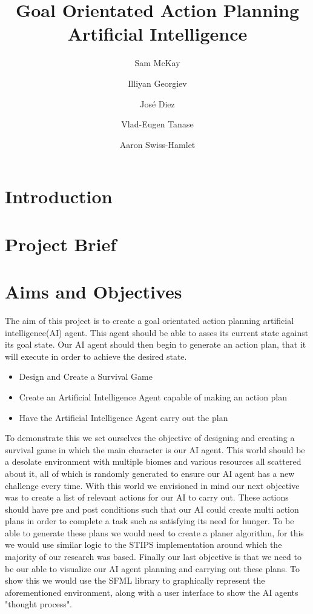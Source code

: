 \documentclass[a4paper]{report}
\begin{document}
\title{Goal Orientated Action Planning Artificial Intelligence}
\author{Sam McKay \and Illiyan Georgiev \and ‎José Diez\and Vlad-Eugen Tanase \and Aaron Swiss-Hamlet }
\maketitle
\tableofcontents
\chapter{Introduction}
\chapter{Project Brief}
\chapter{Aims and Objectives}
The aim of this project is to create a goal orientated action planning artificial intelligence(AI) agent. This agent should be able to asses its current state against its goal state. Our AI agent should then begin to generate an action plan, that it will execute in order to achieve the desired state. \newline

\begin{itemize}
	\item Design and Create a Survival Game
	\item Create an Artificial Intelligence Agent capable of making an action plan
	\item Have the Artificial Intelligence Agent carry out the plan 
\end{itemize}

To demonstrate this we set ourselves the objective of designing and creating a survival game in which the main character is our AI agent. This world should be a desolate environment with multiple biomes and various resources all scattered about it, all of which is randomly generated to ensure our AI agent has a new challenge every time. With this world we envisioned in mind our next objective was to create a list of relevant actions for our AI to carry out. These actions should have pre and post conditions such that our AI could create multi action plans in order to complete a task such as satisfying its need for hunger. To be able to generate these plans we would need to create a planer algorithm, for this we would use similar logic to the STIPS implementation around which the majority of our research was based. Finally our last objective is that we need to be our able to visualize our AI agent planning and carrying out these plans. To show this we would use the SFML library to graphically represent the aforementioned environment, along with a user interface to show the AI agents "thought process".
 
\end{document}
